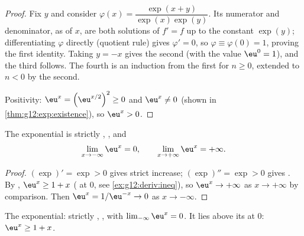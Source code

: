 \begin{proof}
Fix $y$ and consider $\varphi(x) = \dfrac{\exp(x+y)}{\exp(x)\exp(y)}$. Its
numerator and denominator, as  of $x$, are both solutions of
$f' = f$ up to the constant $\exp(y)$; differentiating $\varphi$ directly
(quotient rule) gives $\varphi' = 0$, so
$\varphi \equiv \varphi(0) = 1$, proving the first identity. Taking
$y = -x$ gives the second (with the value $\eu^0 = 1$), and the third
follows. The fourth is an induction from the first for $n \geq 0$, extended
to $n < 0$ by the second.

Positivity: $\eu^x = \left(\eu^{x/2}\right)^2 \geq 0$ and $\eu^x \neq 0$
(shown in \cref{thm:g12:exp:existence}), so $\eu^x > 0$.
\end{proof}

\begin{proposition}\label{prop:g12:exp:variations}
The exponential is strictly , , and
\[
\lim_{x\to-\infty} \eu^x = 0, \qquad
\lim_{x\to+\infty} \eu^x = +\infty .
\]
\end{proposition}

\begin{proof}
$(\exp)' = \exp > 0$ gives strict increase; $(\exp)'' = \exp > 0$ gives
. By , $\eu^x \geq 1 + x$ ( at $0$, see
\cref{ex:g12:deriv:ineq}), so $\eu^x \to +\infty$ as $x \to +\infty$ by
comparison. Then $\eu^{x} = 1/\eu^{-x} \to 0$ as $x \to -\infty$.
\end{proof}

\begin{omfigure}

{\small The exponential: strictly , , with
$\lim_{-\infty} \eu^x = 0$. It lies above its  at $0$:
$\eu^x \geq 1 + x$.}
\end{omfigure}

